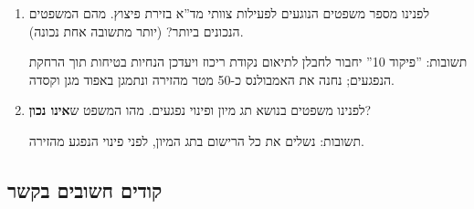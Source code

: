 \documentclass{article}
\begin{document}
\begin{itemize}
\begin{enumerate}
            תשובות: ביצוע פעולות מצילות חיים וחילוץ הנפגעים תוך הרחקתם מסכנה.
        \item לפנינו מספר משפטים הנוגעים לפעילות צוותי מד''א בזירת פיצוץ. מהם המשפטים הנכונים ביותר? (יותר מתשובה אחת נכונה).

            תשובות: ''פיקוד 10'' יחבור לחבלן לתיאום נקודת ריכוז ויעדכן הנחיות בטיחות תוך הרחקת הנפגעים; נחנה את האמבולנס כ-50 מטר מהזירה ונתמגן באפוד מגן וקסדה.
        \item לפנינו משפטים בנושא תג מיון ופינוי נפגעים. מהו המשפט ש\textbf{אינו נכון}?

            תשובות: נשלים את כל הרישום בתג המיון, לפני פינוי הנפגע מהזירה.
    \end{enumerate}
\end{itemize}
\subsection{קודים חשובים בקשר}
\end{document}
